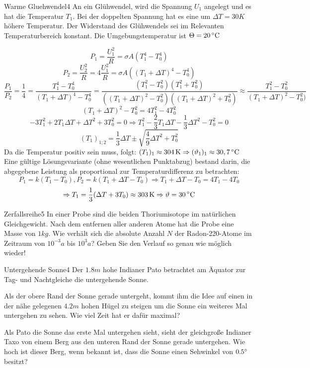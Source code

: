 


\begin{problem}{Warme Gluehwendel}{4}
An ein Glühwendel, wird die Spannung $U_1$ angelegt und es hat die Temperatur $T_1$. Bei der doppelten Spannung hat es eine um $\Delta T=30\unit{K}$ höhere Temperatur. Der Widerstand des Glühwendels sei im Relevanten Temperaturbereich konstant. Die Umgebungstemperatur ist $\Theta=20\,\mathrm{^\circ C}$
\begin{solution}
$$P_1=\frac{U_1^2}R=\sigma A (T_1^4 - T_0^4)$$
$$P_2=\frac{U_2^2}R=4\frac{U_1^2}R=\sigma A ((T_1+\Delta T)^4-T_0^4)$$
$$\frac{P_1}{P_2}=\frac 14=\frac{T_1^4-T_0^4}{(T_1+\Delta T)^4-T_0^4}=\frac{(T_1^2-T_0^2)(T_1^2+T_0^2)}{((T_1+\Delta T)^2-T_0^2)((T_1+\Delta T)^2+T_0^2)}\approx\frac{T_1^2-T_0^2}{(T_1+\Delta T)^2-T_0^2)}$$
$$(T_1+\Delta T)^2-T_0^2=4T_1^2-4T_0^2$$
$$-3T_1^2+2T_1\Delta T+\Delta T^2+3T_0^2=0 \Rightarrow T_1^2-\frac 23 T_1\Delta T-\frac 13 \Delta T^2-T_0^2=0$$
$$(T_1)_{1;2}=\frac 13\Delta T\pm\sqrt{\frac 49\Delta T^2+T_0^2}$$
Da die Temperatur positiv sein muss, folgt: $(T_1)_1\approx 304\,\mathrm{K} \Rightarrow (\vartheta_1)_1 \approx 30,7\,\mathrm{^\circ C}$
Eine gültige Lösungsvariante (ohne wesentlichen Punktabzug) bestand darin, die abgegebene Leistung als proportional zur Temperaturdifferenz zu betrachten:
$$P_1=k(T_1-T_0), P_2=k(T_1+\Delta T-T_0) \Rightarrow T_1+\Delta T-T_0=4T_1-4T_0$$
$$\Rightarrow T_1=\frac 13(\Delta T+3T_0)\approx 303\,\mathrm{K}\Rightarrow \vartheta=30\,\mathrm{^\circ C}$$
\end{solution}
\end{problem}

\begin{problem}{Zerfallsreihe}{5}
In einer Probe sind die beiden Thoriumisotope im natürlichen Gleichgewicht. Nach dem entfernen aller anderen Atome hat die Probe eine Masse von $1 \unit{kg}$. Wie verhält sich die absolute Anzahl $N$ der Radon-220-Atome im Zeitraum von $10^{-3}\unit{a}$ bis $10^3\unit{a}$? Geben Sie den Verlauf so genau wie möglich wieder!
\end{problem}

\begin{problem}{Untergehende Sonne}{4}
Der $1.8\unit{m}$ hohe Indianer Pato betrachtet am Äquator zur Tag- und Nachtgleiche die untergehende Sonne.
 \begin{abcenum}
  \item Als der obere Rand der Sonne gerade untergeht, kommt ihm die Idee auf einen in der nähe gelegenen $4.2 \unit{m}$ hohen Hügel zu steigen um die Sonne ein weiteres Mal untergehen zu sehen. Wie viel Zeit hat er dafür maximal?
  \item Als Pato die Sonne das erste Mal untergehen sieht, sieht der gleichgroße Indianer Taxo von einem Berg aus den unteren Rand der Sonne gerade untergehen. Wie hoch ist dieser Berg, wenn bekannt ist, dass die Sonne einen Sehwinkel von $0.5 ^\circ$ besitzt?
 \end{abcenum}
\end{problem}

